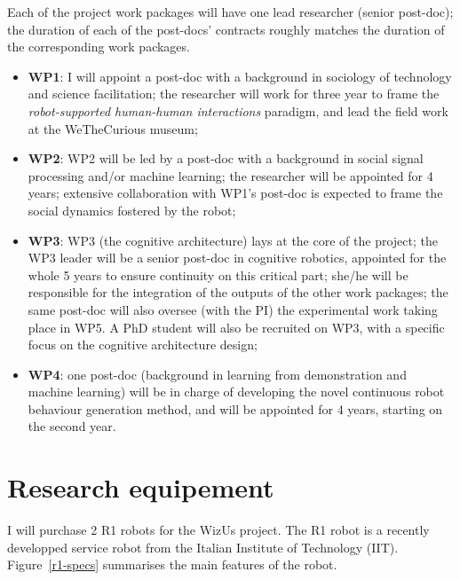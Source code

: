 \documentclass[11pt,a4paper]{report}
\newcommand{\project}{WizUs\xspace}
\begin{document}
Each of the project work packages will have one lead researcher (senior
post-doc); the duration of each of the post-docs' contracts roughly matches the
duration of the corresponding work packages.

\begin{itemize}
    \item \textbf{WP1}: I will appoint a post-doc with a background in sociology
        of technology and science facilitation; the researcher will work for
        three year to frame the \emph{robot-supported human-human interactions}
        paradigm, and lead the field work at the WeTheCurious museum;

    \item \textbf{WP2}: WP2 will be led by a post-doc with a background in
        social signal processing and/or machine learning; the researcher will be
        appointed for 4 years; extensive collaboration with WP1's post-doc is
        expected to frame the social dynamics fostered by the robot;

    \item \textbf{WP3}: WP3 (the cognitive architecture) lays at the core of the
        project; the WP3 leader will be a senior post-doc in cognitive robotics,
        appointed for the whole 5 years to ensure continuity on this critical
        part; she/he will be responsible for the integration of the outputs of
        the other work packages; the same post-doc will also oversee (with the
        PI) the experimental work taking place in WP5. A PhD student will also
        be recruited on WP3, with a specific focus on the cognitive architecture
        design;

    \item \textbf{WP4}: one post-doc (background in learning from demonstration
        and machine learning) will be in charge of developing the novel
        continuous robot behaviour generation method, and will be appointed for
        4 years, starting on the second year.

\end{itemize}
\section{Research equipement}

I will purchase 2 R1 robots for the \project project. The R1 robot is a
recently developped service robot from the Italian Institute of Technology
(IIT). Figure~\ref{r1-specs} summarises the main features of the robot.
\end{document}
